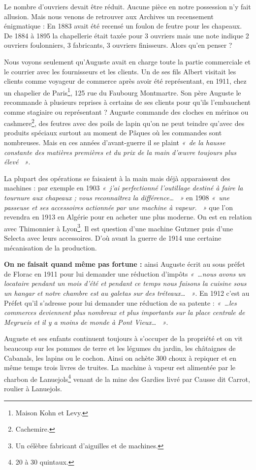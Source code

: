 Le nombre d’ouvriers devait être réduit. Aucune pièce en notre possession n’y fait allusion.
Mais nous venons de retrouver aux Archives un recensement énigmatique :
En 1883 avait été recensé un foulon de feutre pour les chapeaux.
De 1884 à 1895 la chapellerie était taxée pour 3 ouvriers mais une note indique 2 ouvriers
foulonniers, 3 fabricants, 3 ouvriers finisseurs. Alors qu’en penser ?

Nous voyons seulement qu’Auguste avait en charge toute la partie commerciale et le courrier
avec les fournisseurs et les clients. Un de ses fils Albert visitait les clients comme voyageur de
commerce après avoir été représentant, en 1911, chez un chapelier de Paris\footnote{Maison Kohn et
Levy.}, 125 rue du Faubourg Montmartre. Son père Auguste le recommande à plusieurs
reprises à certains de ses clients pour qu’ils l’embauchent comme stagiaire ou représentant ?
Auguste commande des cloches en mérinos ou cashmere\footnote{Cachemire.}, des feutres avec des poils de lapin
qu’on ne peut teindre qu’avec des produits spéciaux surtout au moment de Pâques où les
commandes sont nombreuses.
Mais en ces années d’avant-guerre il se plaint \textit{«~de la hausse constante des matières premières
et du prix de la main d’œuvre toujours plus élevé ~»}.

La plupart des opérations se faisaient à la main mais déjà apparaissent des machines : par
exemple en 1903 \textit{«~j’ai perfectionné l’outillage destiné à faire la tournure aux chapeaux ;
vous reconnaîtrez la différence… ~»} en 1908 \textit{«~une passeuse et ses accessoires actionnée par
une machine à vapeur. ~»} que l’on revendra en 1913 en Algérie pour en acheter une plus
moderne. On est en relation avec Thimonnier à Lyon\footnote{Un célèbre fabricant d’aiguilles et de
machines.}. Il est question d’une machine Gutzner puis d’une Selecta avec leurs accessoires.
D’où avant la guerre de 1914 une certaine mécanisation de la production.

\textbf{On ne faisait quand même pas fortune :} ainsi Auguste écrit au sous préfet de Florac en
1911 pour lui demander une réduction d’impôts \textit{«~…nous avons un locataire pendant un mois
d’été et pendant ce temps nous faisons la cuisine sous un hangar et notre chambre est au
galetas sur des tréteaux… ~»}. En 1912 c’est au Préfet qu’il s’adresse pour lui demander une réduction de sa patente : \textit{«~…les
commerces deviennent plus nombreux et plus importants sur la place centrale de Meyrueis et il y a moins de monde à Pont Vieux… ~»}.

Auguste et ses enfants continuent toujours à s’occuper de la propriété et on vit beaucoup sur
les pommes de terre et les légumes du jardin, les châtaignes de Cabanals, les lapins ou le
cochon. Ainsi on achète 300 choux à repiquer et en même temps trois livres de truites.
La machine à vapeur est alimentée par le charbon de Lanuejols\footnote{20 à 30 quintaux.} venant de
la mine des Gardies livré par Causse dit Carrot, roulier à Lanuejols.

